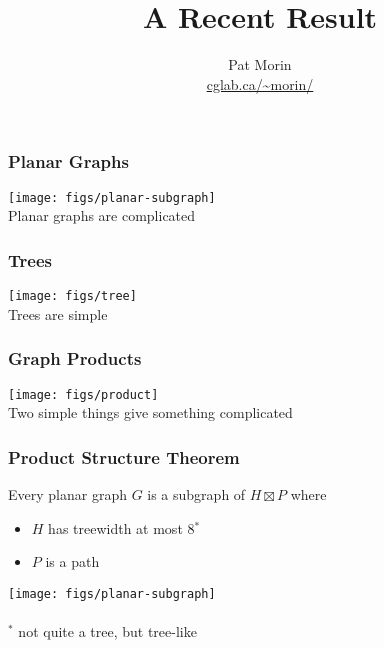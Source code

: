 \documentclass[xcolor=dvipsnames]{beamer}
\title[Graph Product Structure]{A Recent Result}
\author[Pat Morin]{Pat Morin \\ \url{cglab.ca/~morin/}}
\begin{document}
\begin{frame}
  \titlepage
\end{frame}


\begin{frame}
\frametitle{Planar Graphs}

\begin{center}
    \texttt{[image: figs/planar-subgraph]} \\
    Planar graphs are complicated
\end{center}
\end{frame}


\begin{frame}
\frametitle{Trees}

\begin{center}
    \texttt{[image: figs/tree]} \\
    Trees are simple
\end{center}
\end{frame}


\begin{frame}
\frametitle{Graph Products}

\begin{center}
    \texttt{[image: figs/product]} \\
    Two simple things give something complicated
\end{center}
\end{frame}


\begin{frame}
\frametitle{Product Structure Theorem}

Every planar graph $G$ is a subgraph of $H\boxtimes P$ where
\begin{itemize}
    \item $H$ has treewidth at most 8$^*$
    \item $P$ is a path
\end{itemize}
    \texttt{[image: figs/planar-subgraph]} \raisebox{.11\textwidth}{$\subseteq$}
    \\
 \\[3ex]

    $^*$ not quite a tree, but tree-like
\end{frame}
\end{document}
